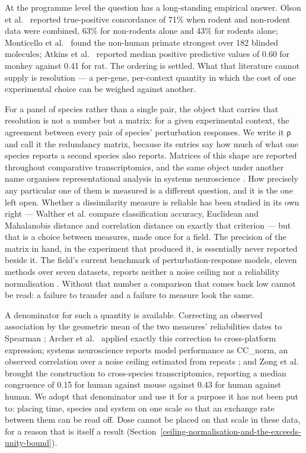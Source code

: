 \documentclass[11pt,a4paper]{article}
\begin{document}
At the programme level the question has a long-standing empirical
answer. Olson et al.~\cite{ref5} reported true-positive concordance of 71\%
when rodent and non-rodent data were combined, 63\% for non-rodents
alone and 43\% for rodents alone; Monticello et al.~\cite{ref6} found the
non-human primate strongest over 182 blinded molecules; Atkins et
al.~\cite{ref7} reported median positive predictive values of 0.60 for
monkey against 0.41 for rat. The ordering is settled. What that
literature cannot supply is resolution --- a per-gene, per-context
quantity in which the cost of one experimental choice can be weighed
against another.

For a panel of species rather than a single pair, the object that
carries that resolution is not a number but a matrix: for a given
experimental context, the agreement between every pair of species'
perturbation responses. We write it ρ and call it the redundancy matrix,
because its entries say how much of what one species reports a second
species also reports. Matrices of this shape are reported throughout
comparative transcriptomics, and the same object under another name
organises representational analysis in systems neuroscience \cite{ref24}.
How precisely any particular one of them is measured is a different
question, and it is the one left open. Whether a dissimilarity measure
is reliable has been studied in its own right --- Walther et al.
\cite{ref32} compare classification accuracy, Euclidean and Mahalanobis
distance and correlation distance on exactly that criterion --- but that
is a choice between measures, made once for a field. The precision of
the matrix in hand, in the experiment that produced it, is essentially
never reported beside it. The field's current benchmark of
perturbation-response models, eleven methods over seven datasets,
reports neither a noise ceiling nor a reliability normalisation
\cite{ref61}. Without that number a comparison that comes back low cannot be
read: a failure to transfer and a failure to measure look the same.

A denominator for such a quantity is available. Correcting an observed
association by the geometric mean of the two measures' reliabilities
dates to Spearman \cite{ref8}; Archer et al.~\cite{ref9} applied exactly this
correction to cross-platform expression; systems neuroscience reports
model performance as CC\_norm, an observed correlation over a noise
ceiling estimated from repeats \cite{ref10,ref11}; and Zong et al.~\cite{ref12}
brought the construction to cross-species transcriptomics, reporting a
median congruence of 0.15 for human against mouse against 0.43 for human
against human. We adopt that denominator and use it for a purpose it has
not been put to: placing time, species and system on one scale so that
an exchange rate between them can be read off. Dose cannot be placed on
that scale in these data, for a reason that is itself a result (Section~\ref{ceiling-normalisation-and-the-exceeds-unity-bound}).
\end{document}
